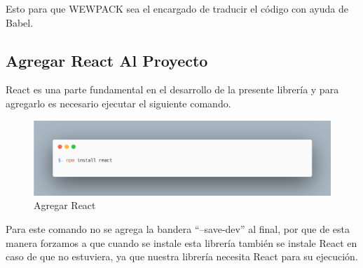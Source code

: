     \newline
    \newline
    Esto para que WEWPACK sea el encargado de traducir el código con ayuda de Babel.
    
    
    \subsection{Agregar React Al Proyecto}
    React es una parte fundamental en el desarrollo de la presente librería y para agregarlo es necesario ejecutar el siguiente comando.
    \newline
    \newline
     \begin{figure}[H]
    \includegraphics[width=1\textwidth]{./Imagenes/image23.png}
    \caption[Agregar React]{Agregar React}
    \end{figure}
    \newline
    \newline
    Para este comando no se agrega la bandera “–save-dev” al final, por que de esta manera forzamos a que cuando se instale esta librería también se instale React en caso de que no estuviera, ya que nuestra librería necesita React para su ejecución.
    
    

